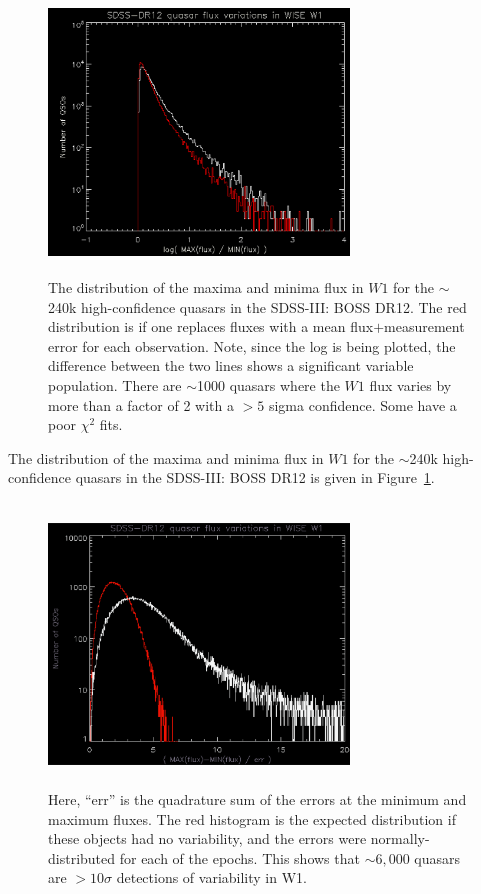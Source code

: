 \documentclass[apj]{emulateapj}
\begin{document}
\begin{figure}
  \includegraphics[width=8.00cm, height=7.50cm, trim=0.0cm 0.0cm 0.0cm 0.0cm, clip]
  {fig1.png}
  \centering
  \caption[]{
    The distribution of the maxima and
    minima flux in $W1$ for the $\sim$240k high-confidence quasars in the
    SDSS-III: BOSS DR12.  The red distribution is if one replaces fluxes
    with a mean flux$+$measurement error for each observation.  Note,
    since the log is being plotted, the difference between the two lines
    shows a significant variable population.  There are $\sim$1000 quasars
    where the $W1$ flux varies by more than a factor of 2 with a $>5$
    sigma confidence.  Some have a poor $\chi{^2}$ fits.
  }
  \label{fig:maxminflux}
\end{figure}
The distribution of the maxima and minima flux in $W1$ for the
$\sim$240k high-confidence quasars in the SDSS-III: BOSS DR12 is given
in Figure~\ref{fig:maxminflux}.

\begin{figure}
  \includegraphics[width=8.00cm, height=7.50cm, trim=0.0cm 0.0cm 0.0cm 0.0cm, clip]
  {fig2.png}
  \centering
  \caption[]{
    Here, ``err'' is the quadrature sum of the errors at the minimum and maximum fluxes.
    The red histogram is the expected distribution if these objects had no variability, 
    and the errors were normally-distributed for each of the epochs.
    This shows that $\sim6,000$ quasars are $>10\sigma$ detections of variability in W1.
  }
  \label{fig:maxmin_err}
\end{figure}
\end{document}
